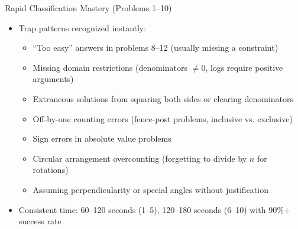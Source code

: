 \documentclass{article}
\begin{document}
\begin{masterybox}{Rapid Classification Mastery (Problems 1--10)}
\begin{itemize}[nosep]
\begin{itemize}[nosep]
  \item[$\square$] Powers of 2 memorized (up to $2^{16}$ = 65,536)
  \item[$\square$] Quick fraction-decimal conversions ($\frac{1}{6}=0.1\overline{6}$, $\frac{1}{7}\approx0.143$, etc.)
  \item[$\square$] Common roots approximated ($\sqrt{2}\approx1.414$, $\sqrt{3}\approx1.732$, $\sqrt{5}\approx2.236$)
  \end{itemize}
\item[$\square$] Trap patterns recognized instantly:
  \begin{itemize}[nosep]
  \item[$\square$] ``Too easy'' answers in problems 8--12 (usually missing a constraint)
  \item[$\square$] Missing domain restrictions (denominators $\neq 0$, logs require positive arguments)
  \item[$\square$] Extraneous solutions from squaring both sides or clearing denominators
  \item[$\square$] Off-by-one counting errors (fence-post problems, inclusive vs. exclusive)
  \item[$\square$] Sign errors in absolute value problems
  \item[$\square$] Circular arrangement overcounting (forgetting to divide by $n$ for rotations)
  \item[$\square$] Assuming perpendicularity or special angles without justification
  \end{itemize}
\item[$\square$] Consistent time: 60--120 seconds (1--5), 120--180 seconds (6--10) with 90\%+ success rate
\end{itemize}
\end{masterybox}
\end{document}

